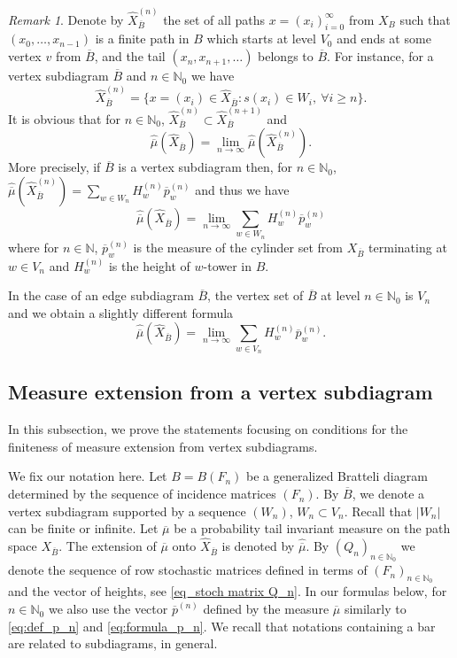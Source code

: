 \documentclass[11pt,reqno]{amsart}
\theoremstyle{definition}
\theoremstyle{remark}
\newtheorem{remark}[definition]{Remark}
\theoremstyle{plain}
\def\ol{\overline}
\def\ov{\overline}
\def\wh{\widehat}
\newcommand{\N}{\mathbb N}
\numberwithin{equation}{section}
\begin{document}
\begin{remark}
Denote by $\wh X_{\ol B}^{(n)}$ the set of all paths 
$x = (x_i)_{i= 0 }^{\infty}$  from $X_B$ such that $(x_0, \ldots, x_{n-1})$ is a finite path in $B$ which starts at level $V_0$ and ends at some vertex $v$ from $\ol B$, and the tail  $(x_{n},x_{n+1},\ldots)$ belongs to $\overline{B}$.
For instance, for a vertex subdiagram $\ov B$ and $n \in \N_0$ we have
\begin{equation}\label{n-th level}
\wh X_{\ol B}^{(n)} = \{x = (x_i)\in \wh X_{\ol B} : s(x_i) \in W_i, \ \forall i \geq n\}.
\end{equation}
It is obvious that for $n \in \N_0$, $\wh X_{\ol B}^{(n)} \subset \wh X_{\ol B}^{(n+1)}$ and
\begin{equation}\label{extension_method}
\widehat{\ov \mu}(\wh X_{\ol B}) = \lim_{n\to\infty} \widehat{\ov \mu}(\wh X_{\ol B}^{(n)}).
\end{equation}
More precisely, if $\ov B$ is a vertex subdiagram then, for $n \in \N_0$, $\widehat{\ov \mu}(\wh X_{\ol B}^{(n)}) = \sum_{w\in W_n}  H^{(n)}_w \ov p^{(n)}_w$ and thus we have
\begin{equation}\label{extension_method_vertex}
\widehat{\ov \mu}(\wh X_{\ol B}) = \lim_{n\to\infty}\sum_{w\in W_n}  H^{(n)}_w \ov p^{(n)}_w
\end{equation}
where for $n \in \N$, $\ol p_w^{(n)}$ is the measure of the cylinder set from $X_{\ol B}$ terminating at $w \in V_n$ and $H^{(n)}_w$ is the height of $w$-tower in $B$. 
\end{remark} 


In the case of an edge subdiagram $\ol B$, the vertex set of $\ol B$ at level $n \in \N_0$ is $V_n$ and we obtain  a slightly different formula
\begin{equation}\label{extension_method_edge}
\widehat{\ov \mu}(\wh X_{\ol B}) = \lim_{n\to\infty}\sum_{w\in V_n}  H^{(n)}_w \ov p^{(n)}_w.
\end{equation}

\subsection{Measure extension from a vertex subdiagram} 
In this subsection, we prove the statements focusing on conditions for the finiteness of measure extension from vertex subdiagrams. 

We fix our notation here. Let $B = B(F_n)$ be a generalized Bratteli 
diagram determined by the sequence of incidence matrices $(F_n)$. 
By $\overline B$, we denote a vertex subdiagram supported by 
a sequence $(W_n)$, $W_n \subset V_n$. Recall that $|W_n|$ can be finite or infinite. Let $\ol \mu$ be a probability tail invariant measure on the path space $X_{\ol B}$. 
The extension of $\ol \mu$ onto  $\wh X_{\overline B}$ is denoted
by $\wh{\ol \mu}$. 
By $(Q_n)_{n \in \N_0}$ we denote the sequence of row stochastic matrices defined 
in terms of $(F_n)_{n \in \N_0}$ and the vector of heights, see \eqref{eq_stoch matrix Q_n}. In our formulas below, for $n \in \N_0$ we also use the vector $\ol p^{(n)}$
defined by the measure $\ol \mu$ similarly to \eqref{eq:def_p_n} and \eqref{eq:formula_p_n}. We recall that notations containing a bar are related to subdiagrams, in general. 
\end{document}
